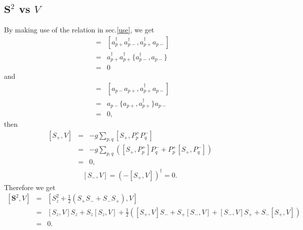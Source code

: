\documentclass{article}
\begin{document}
\subsection{$\bm{S}^2$ vs $V$}
By making use of the relation in sec.\ref{use}, we get
\begin{eqnarray*}
[P_p^{+},S_+] &=& [a_{p+}^{\dagger}a_{p-}^{\dagger} , a_{p+}^{\dagger} a_{p-} ] \\
&=& a_{p+}^{\dagger} a_{p+}^{\dagger} \bigl\{ a_{p-}^{\dagger} , a_{p-}  \bigr\} \\
&=& 0
\end{eqnarray*}
and
\begin{eqnarray*}
[P_p^{-},S_+] &=& [ a_{p-} a_{p+} , a_{p+}^{\dagger} a_{p-} ] \\
&=& a_{p-}  \bigl\{ a_{p+} , a_{p+}^{\dagger}  \bigr\} a_{p-} \\
&=& 0,
\end{eqnarray*}
then
\begin{eqnarray*}
\left[ S_{+},V \right] &=& -g \sum_{p,q} [S_{+},P_p^{+}P_q^{-}] \\
&=& -g \sum_{p,q} \left( [S_{+},P_p^{+}]P_q^{-} + P_p^{+} [S_{+},P_q^{-}] \right) \\
&=& 0,
\end{eqnarray*}
\begin{eqnarray*}
\left[ S_{-},V \right] = \left( - [S_{+} , V ] \right)^{\dagger} = 0.
\end{eqnarray*}
Therefore we get
\begin{eqnarray*}
\left[ \bm{S}^2,V \right] &=& [ S_z^2 + \frac{1}{2}(S_{+}S_{-} + S_{-}S_{+}) , V ] \\
&=& [S_z,V]S_z + S_z[S_z,V] + \frac{1}{2} \left( [S_{+},V] S_{-} + S_{+} [S_{-},V] + [S_{-},V] S_{+} + S_{-} [S_{+},V] \right) \\
&=& 0.
\end{eqnarray*}
\end{document}
